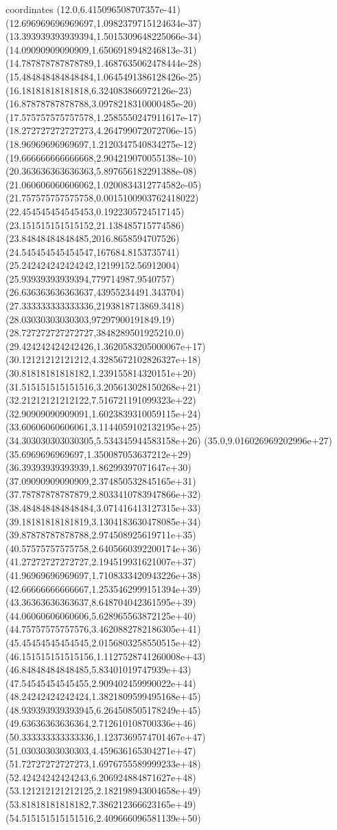 coordinates {%
(12.0,6.415096508707357e-41)
(12.696969696969697,1.0982379715124634e-37)
(13.393939393939394,1.5015309648225066e-34)
(14.09090909090909,1.6506918948246813e-31)
(14.787878787878789,1.4687635062478444e-28)
(15.484848484848484,1.0645491386128426e-25)
(16.18181818181818,6.324083866972126e-23)
(16.87878787878788,3.0978218310000485e-20)
(17.575757575757578,1.2585550247911617e-17)
(18.272727272727273,4.264799072072706e-15)
(18.96969696969697,1.2120347540834275e-12)
(19.666666666666668,2.904219070055138e-10)
(20.363636363636363,5.897656182291388e-08)
(21.060606060606062,1.0200834312774582e-05)
(21.757575757575758,0.0015100903762418022)
(22.454545454545453,0.1922305724517145)
(23.151515151515152,21.138485715774586)
(23.84848484848485,2016.8658594707526)
(24.545454545454547,167684.8153735741)
(25.242424242424242,12199152.56912004)
(25.93939393939394,779714987.9540757)
(26.636363636363637,43955234491.343704)
(27.333333333333336,2193818713869.3418)
(28.03030303030303,97297900191849.19)
(28.727272727272727,3848289501925210.0)
(29.424242424242426,1.3620583205000067e+17)
(30.12121212121212,4.3285672102826327e+18)
(30.81818181818182,1.239155814320151e+20)
(31.515151515151516,3.205613028150268e+21)
(32.21212121212122,7.516721191099323e+22)
(32.90909090909091,1.6023839310059115e+24)
(33.60606060606061,3.1144059102132195e+25)
(34.303030303030305,5.534345944583158e+26)
(35.0,9.016026969202996e+27)
(35.6969696969697,1.350087053637212e+29)
(36.39393939393939,1.86299397071647e+30)
(37.09090909090909,2.374850532845165e+31)
(37.78787878787879,2.8033410783947866e+32)
(38.484848484848484,3.071416413127315e+33)
(39.18181818181819,3.1304183630478085e+34)
(39.87878787878788,2.974508925619711e+35)
(40.57575757575758,2.6405660392200174e+36)
(41.27272727272727,2.194519931621007e+37)
(41.96969696969697,1.7108333420943226e+38)
(42.66666666666667,1.2535462999151394e+39)
(43.36363636363637,8.648704042361595e+39)
(44.06060606060606,5.628965563872125e+40)
(44.75757575757576,3.4620882782186305e+41)
(45.45454545454545,2.0156803258550515e+42)
(46.151515151515156,1.1127528741260008e+43)
(46.84848484848485,5.83401019747939e+43)
(47.54545454545455,2.909402459990022e+44)
(48.24242424242424,1.3821809599495168e+45)
(48.939393939393945,6.264508505178249e+45)
(49.63636363636364,2.712610108700336e+46)
(50.333333333333336,1.1237369574701467e+47)
(51.03030303030303,4.459636165304271e+47)
(51.72727272727273,1.6976755589999233e+48)
(52.42424242424243,6.206924884871627e+48)
(53.121212121212125,2.182198943004658e+49)
(53.81818181818182,7.386212366623165e+49)
(54.515151515151516,2.409666096581139e+50)
}
